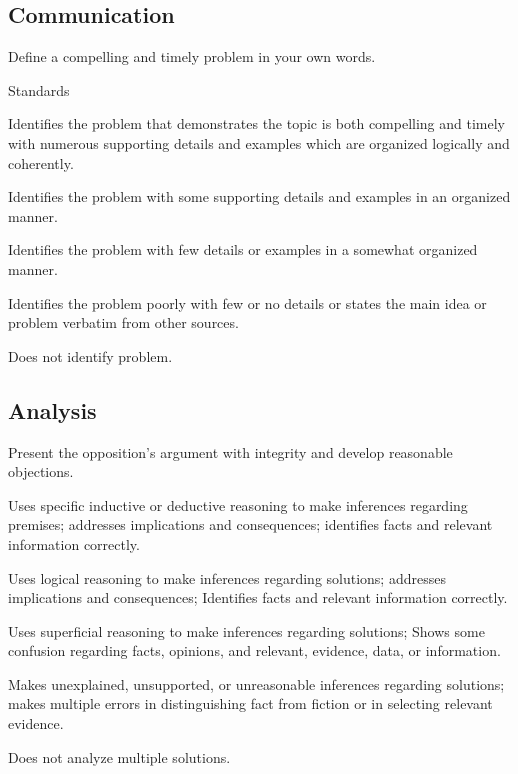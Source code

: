 \documentclass{tufte-handout}\usepackage[]{graphicx}\usepackage[]{color}
\newenvironment{enumerate*}%
  {\begin{enumerate}%
    \setlength{\itemsep}{0pt}%
    \setlength{\parskip}{0pt}}%
  {\end{enumerate}}
\begin{document}
\subsection{Communication}

Define a compelling and timely problem in your own words. 

Standards

\begin{enumerate*}
	\item Identifies the problem that demonstrates the topic is both compelling and timely with numerous supporting details and examples which are organized logically and coherently.		
	\item Identifies the problem with some supporting details and examples in an organized manner.	
	\item Identifies the problem with few details or examples in a somewhat organized manner.	
	\item Identifies the problem poorly with few or no details or states the main idea or problem verbatim from other sources.
	\item Does not identify problem.
\end{enumerate*}

\subsection{Analysis}

Present the opposition's argument with integrity and develop reasonable objections.

\begin{enumerate*}
	\item Uses specific inductive or deductive reasoning to make inferences regarding premises; addresses implications and consequences; identifies facts and relevant information correctly.	
	\item Uses logical reasoning to make inferences regarding solutions; addresses implications and consequences; Identifies facts and relevant information correctly.		
	\item Uses superficial reasoning to make inferences regarding solutions; Shows some confusion regarding facts, opinions, and relevant, evidence, data, or information.	
	\item Makes unexplained, unsupported, or unreasonable inferences regarding solutions; makes multiple errors in distinguishing fact from fiction or in selecting relevant evidence. 	
	\item Does not analyze multiple solutions.
\end{enumerate*}
\end{document}
